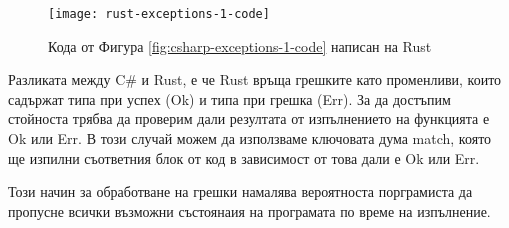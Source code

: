 \begin{figure}[!htb]
  \texttt{[image: rust-exceptions-1-code]}
  \centering
  \caption{Кода от Фигура \ref{fig:csharp-exceptions-1-code} написан на Rust}
  \label{fig:rust-exceptions-1-code}
\end{figure}

Разликата между C\# и Rust, е че Rust връща грешките като променливи, които
садържат типа при успех (Ok) и типа при грешка (Err).
За да достъпим стойноста трябва да проверим дали резултата от изпълнението на
функцията е Ok или Err. В този случай можем да използваме ключовата дума match,
която ще изпилни съответния блок от код в зависимост от това дали е Ok или Err.

Този начин за обработване на грешки намалява вероятноста порграмиста да
пропусне всички възможни състоянаия на програмата по време на изпълнение.
